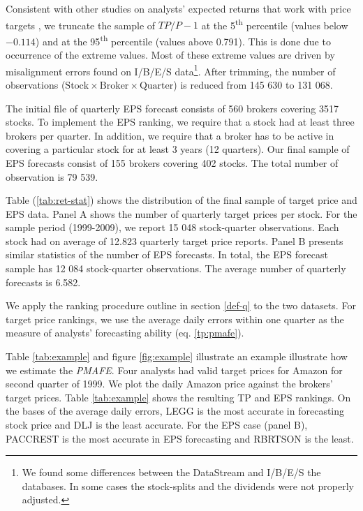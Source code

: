 \documentclass{article}\usepackage[]{graphicx}\usepackage[]{color}
\begin{document}
Consistent with other studies on analysts' expected returns that work with price targets  \citep{bradshaw2002,brav2003,da2011}, we truncate the sample of $TP/P-1$ at the 5\textsuperscript{th} percentile (values below \ensuremath{-0.114}) and at the 95\textsuperscript{th} percentile (values above 0.791). This is done due to occurrence of the extreme values. Most of these extreme values are driven by misalignment errors found on I/B/E/S data\footnote{We found some differences between the  DataStream and I/B/E/S the databases. In some cases the stock-splits and the dividends were not properly adjusted.}. After trimming, the number of observations ($\mathrm{Stock} \times \mathrm{Broker} \times  \mathrm{Quarter}$) is reduced  from 145 630 to 131 068.

The initial file of quarterly EPS forecast consists of  560 brokers covering 3517 stocks. To implement the EPS ranking, we require that a stock had at least three brokers per quarter. In addition, we require that a broker has to be active in covering a particular stock for at least 3 years (12 quarters). Our final sample of EPS forecasts consist of  155 brokers covering 402 stocks. The total number of observation is 79 539.
 

Table (\ref{tab:ret-stat}) shows the distribution of the final sample of target price and EPS data. Panel A shows the number of quarterly target prices per stock. For the sample period (1999-2009), we report 15 048 stock-quarter observations. Each stock had on average of 12.823 quarterly target price reports. Panel B  presents similar statistics of the number of EPS forecasts. In total, the EPS forecast sample has 12 084 stock-quarter observations. The average number of quarterly forecasts is 6.582.

We apply the ranking procedure outline in section \ref{def-q} to the two datasets. For target price rankings, we use the average daily errors within one quarter as the measure of analysts' forecasting ability (eq. \ref{tp:pmafe}). 

Table \ref{tab:example} and figure \ref{fig:example} illustrate an example illustrate how we estimate the \textit{PMAFE}. Four analysts had valid target prices for Amazon for second quarter of 1999. We plot the daily Amazon price against the brokers' target prices. Table \ref{tab:example} shows the resulting TP and EPS rankings. On the bases of the average daily errors, LEGG is the most accurate in forecasting stock price and  DLJ is the least accurate. For the EPS case (panel B), PACCREST is the most accurate in EPS forecasting and RBRTSON is the least. 
\end{document}
